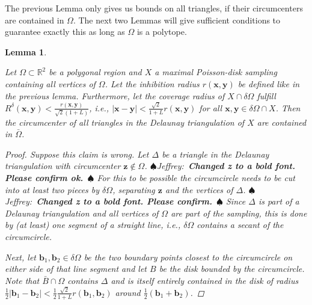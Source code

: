 \documentclass[preprint, 10pt]{elsarticle}
\newcommand{\vx}{{\mathbf x}}
\newcommand{\vy}{{\mathbf y}}
\newcommand{\vz}{{\mathbf z}}
\newcommand{\vb}{{\mathbf b}}
\newif\ifnotesw \noteswtrue
\newcommand{\jeffrey}[1]{\ifnotesw  \textcolor[rgb]{0,0,1}{  $\spadesuit$Jeffrey:\ {\sf \bf \it #1}\ $\spadesuit$ }\fi}
\newtheorem{lemma}[theorem]{Lemma}
\theoremstyle{definition}
\theoremstyle{remark}
\begin{document}
The previous Lemma only gives us bounds on all triangles, if their circumcenters are contained in $\Omega$. 
The next two Lemmas will give sufficient conditions to guarantee exactly this as long as $\Omega$ is a polytope.
\begin{lemma}\label{lemma:circinside}

	Let $\Omega\subset\mathbb{R}^2$ be a polygonal region and $X$ a maximal Poisson-disk sampling containing all vertices of $\Omega$. Let the inhibition radius $r(\vx,\vy)$ be defined like in the previous lemma. 
	Furthermore, let the coverage radius of $X\cap \delta \Omega$ fulfill $R^\delta(\vx,\vy)<\frac{r(\vx,\vy)}{\sqrt{2}(1+L)}$, i.e., $|\vx-\vy|<{\frac{\sqrt{2}}{1+L}}r(\vx,\vy)$ for all $\vx,\vy\in \delta\Omega\cap X$. 
    Then the circumcenter of all triangles in the Delaunay triangulation of $X$ are contained in $\bar{\Omega}$.
	\begin{proof}
		Suppose this claim is wrong.
        Let $\Delta$ be a triangle in the Delaunay triangulation with circumcenter $\vz\notin \Omega$.\jeffrey{Changed z to a bold font. Please confirm ok.}
        For this to be possible the circumcircle needs to be cut into at least two pieces by $\delta\Omega$, separating $\vz$ and the vertices of $\Delta$.\jeffrey{Changed z to a bold font. Please confirm.} 
        Since $\Delta$ is part of a Delaunay triangulation and all vertices of $\Omega$ are part of the sampling, this is done by (at least) one segment of a straight line, i.e., $\delta \Omega$ contains a secant of the circumcircle.

		Next, let $\vb_1,\vb_2\in \delta\Omega$ be the two boundary points closest to the circumcircle on either side of that line segment and let $B$ be the disk bounded by the circumcircle. 
        Note that $\bar{B}\cap\Omega$ contains $\Delta$ and  is itself entirely contained in the disk of radius $\frac{1}{2}|\vb_1-\vb_2|<\frac{1}{2}{\frac{\sqrt{2}}{1+L}}r(\vb_1,\vb_2)$ around $\frac{1}{2}(\vb_1+\vb_2)$.



\end{proof}
\end{lemma}
\end{document}
